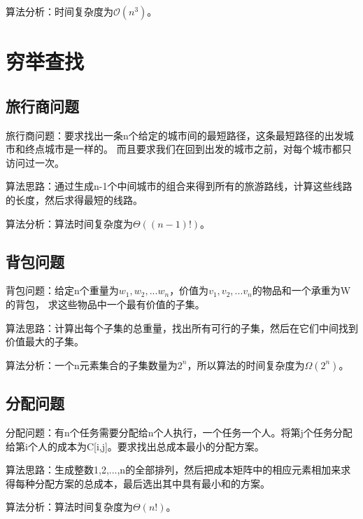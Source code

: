 \documentclass[a4paper,left=2.5cm,right=2.5cm,11pt]{article}
\begin{document}
	算法分析：时间复杂度为$\mathcal{O}(n^3)$。

\section{穷举查找}
\subsection{旅行商问题}
	旅行商问题：要求找出一条n个给定的城市间的最短路径，这条最短路径的出发城市和终点城市是一样的。
	而且要求我们在回到出发的城市之前，对每个城市都只访问过一次。\par
	算法思路：通过生成n-1个中间城市的组合来得到所有的旅游路线，计算这些线路的长度，然后求得最短的线路。\par
	算法分析：算法时间复杂度为$\Theta((n-1)!)$。

\subsection{背包问题}
	背包问题：给定n个重量为$w_1,w_2, ... w_n$，价值为$v_1,v_2, ... v_n$的物品和一个承重为W的背包，
	求这些物品中一个最有价值的子集。\par
	算法思路：计算出每个子集的总重量，找出所有可行的子集，然后在它们中间找到价值最大的子集。\par
	算法分析：一个n元素集合的子集数量为$2^n$，所以算法的时间复杂度为$\Omega(2^n)$。

\subsection{分配问题}
	分配问题：有n个任务需要分配给n个人执行，一个任务一个人。将第j个任务分配给第i个人的成本为C[i,j]。要求找出总成本最小的分配方案。\par
	算法思路：生成整数1,2,...,n的全部排列，然后把成本矩阵中的相应元素相加来求得每种分配方案的总成本，最后选出其中具有最小和的方案。\par
	算法分析：算法时间复杂度为$\Theta(n!)$。
\end{document}
